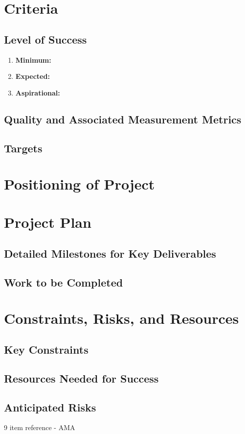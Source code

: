 \documentclass{article}
\begin{document}
\section{Criteria}
\subsection{Level of Success}
\begin{enumerate}
    \item \textbf{Minimum: }
    
    \item \textbf{Expected: }
        
    \item \textbf{Aspirational: }

\end{enumerate}
\subsection{Quality and Associated Measurement Metrics}

\subsection{Targets}

\section{Positioning of Project}


\section{Project Plan}
\subsection{Detailed Milestones for Key Deliverables}


\subsection{Work to be Completed}


\section{Constraints, Risks, and Resources}
\subsection{Key Constraints}


\subsection{Resources Needed for Success}

\subsection{Anticipated Risks}

\pagebreak
\begin{thebibliography}{9}
item reference - AMA
\end{thebibliography}
\end{document}
